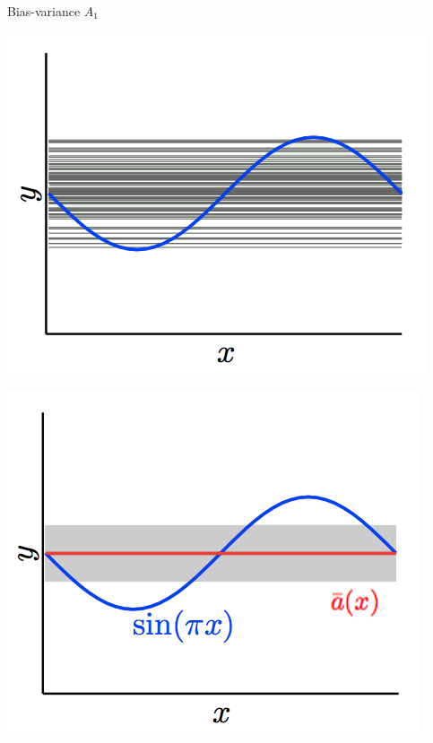 \documentclass[10pt]{beamer}
\begin{document}
\begin{frame}{Bias-variance $A_1$}
  \centering
  \begin{minipage}[b]{.45\textwidth}
    \includegraphics[width=\textwidth, keepaspectratio]{images/sin3} 
  \end{minipage}\qquad
  \pause
  \begin{minipage}[b]{.45\textwidth}
    \includegraphics[width=\textwidth, keepaspectratio]{images/sin31}
  \end{minipage}
\end{frame}
\end{document}
